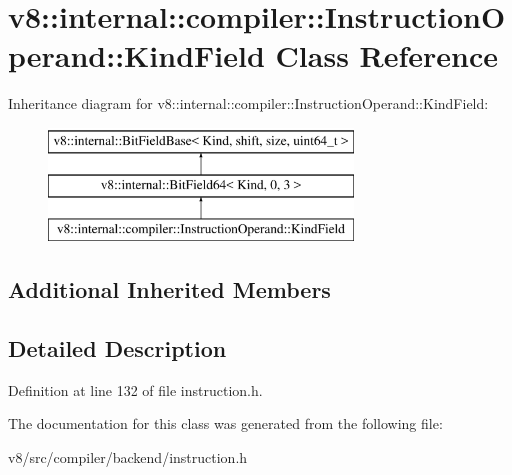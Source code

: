 \hypertarget{classv8_1_1internal_1_1compiler_1_1InstructionOperand_1_1KindField}{}\section{v8\+:\+:internal\+:\+:compiler\+:\+:Instruction\+Operand\+:\+:Kind\+Field Class Reference}
\label{classv8_1_1internal_1_1compiler_1_1InstructionOperand_1_1KindField}
Inheritance diagram for v8\+:\+:internal\+:\+:compiler\+:\+:Instruction\+Operand\+:\+:Kind\+Field\+:\begin{figure}[H]
\begin{center}
\leavevmode
\includegraphics[height=3.000000cm]{classv8_1_1internal_1_1compiler_1_1InstructionOperand_1_1KindField}
\end{center}
\end{figure}
\subsection*{Additional Inherited Members}


\subsection{Detailed Description}


Definition at line 132 of file instruction.\+h.



The documentation for this class was generated from the following file\+:\begin{DoxyCompactItemize}
\item 
v8/src/compiler/backend/instruction.\+h\end{DoxyCompactItemize}
